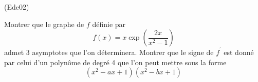 \begin{tiny}(Ede02)\end{tiny}
Montrer que le graphe de $f$ définie par
\begin{displaymath}
 f(x)=x\exp \left( \frac{2x}{x^{2}-1}\right)
\end{displaymath}
admet 3 asymptotes que l'on d{\'e}terminera. Montrer que le signe de $f^{^{\prime }}$ est donn{\'e} par celui d'un
polyn{\^o}me de degr{\'e} 4 que l'on peut mettre sous la forme
\begin{displaymath}
 (x^{2}-ax+1)(x^{2}-bx+1)
\end{displaymath}